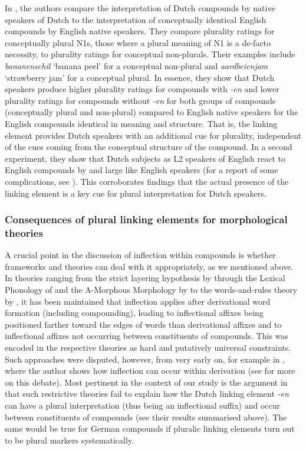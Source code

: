 In \textcite{BangaEa2013b}, the authors compare the interpretation of Dutch compounds by native speakers of Dutch to the interpretation of conceptually identical English compounds by English native speakers.
They compare plurality ratings for conceptually plural N1s, \ie those where a plural meaning of N1 is a de-facto necessity, to plurality ratings for conceptual non-plurals.
Their examples include \textit{bananenschil} `banana peel' for a conceptual non-plural and \textit{aardbeienjam} `strawberry jam' for a conceptual plural.
In essence, they show that Dutch speakers produce higher plurality ratings for compounds with \textit{-en} and lower plurality ratings for compounds without \textit{-en} for both groups of compounds (conceptually plural and non-plural) compared to English native speakers for the English compounds identical in meaning and structure.
That is, the linking element provides Dutch speakers with an additional cue for plurality, independent of the cues coming from the conceptual structure of the compound.
In a second experiment, they show that Dutch subjects as L2 speakers of English react to English compounds by and large like English speakers (for a report of some complications, see \citealt[211]{BangaEa2013b}).
This corroborates findings that the actual presence of the linking element is a key cue for plural interpretation for Dutch speakers.


\subsubsection{Consequences of plural linking elements for morphological theories}
\label{sec:consequencesofplurallinkagesformorphologicaltheories}

A crucial point in the discussion of inflection within compounds is whether frameworks and theories can deal with it appropriately, as we mentioned above.
In theories ranging from the strict layering hypothesis by \textcite{Siegel1979} through the Lexical Phonology of \textcite{Mohanan1986} and the A-Morphous Morphology by \textcite{Anderson1992} to the words-and-rules theory by \textcite{Pinker1999}, it has been maintained that inflection applies after derivational word formation (including compounding), leading to inflectional affixes being positioned farther toward the edges of words than derivational affixes and to inflectional affixes not occurring between constituents of compounds.
This was encoded in the respective theories as hard and putatively universal constraints.
Such approaches were disputed, however, from very early on, for example in \textcite{Bochner1984}, where the author shows how inflection can occur within derivation (see \citealt[2--3]{KirchnerNicoladis2009} for more on this debate).
Most pertinent in the context of our study is the argument in \textcite[47--48]{BangaEa2013a} that such restrictive theories fail to explain how the Dutch linking element \textit{-en} can have a plural interpretation (thus being an inflectional suffix) and occur between constituents of compounds (see their results summarised above).
The same would be true for German compounds if pluralic linking elements turn out to be plural markers systematically.

